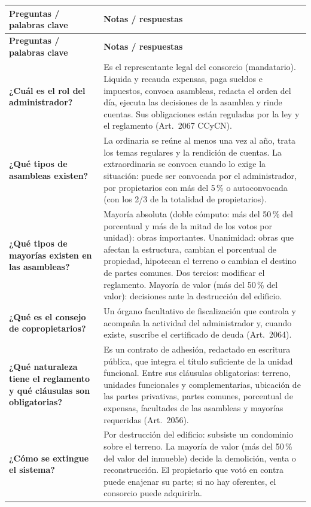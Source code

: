 \documentclass[12pt,oneside]{book}
\newcommand{\cornellheader}{%
    \toprule
    \textbf{Preguntas / palabras clave} &
    \textbf{Notas / respuestas} \\
    \midrule
}
\begin{document}
\begin{longtable}{@{}>{\raggedright\arraybackslash}p{}>{\raggedright\arraybackslash}p{}@{}}
\cornellheader
\endfirsthead
\cornellheader
\endhead

\textbf{¿Cuál es el rol del administrador?} &
Es el representante legal del consorcio (mandatario). Liquida y recauda expensas, paga sueldos e impuestos, convoca asambleas, redacta el orden del día, ejecuta las decisiones de la asamblea y rinde cuentas. Sus obligaciones están reguladas por la ley y el reglamento (Art.~2067 CCyCN). \\[0.8em]

\textbf{¿Qué tipos de asambleas existen?} &
La ordinaria se reúne al menos una vez al año, trata los temas regulares y la rendición de cuentas. La extraordinaria se convoca cuando lo exige la situación: puede ser convocada por el administrador, por propietarios con más del 5\,\% o autoconvocada (con los 2/3 de la totalidad de propietarios). \\[0.8em]

\textbf{¿Qué tipos de mayorías existen en las asambleas?} &
Mayoría absoluta (doble cómputo: más del 50\,\% del porcentual y más de la mitad de los votos por unidad): obras importantes. Unanimidad: obras que afectan la estructura, cambian el porcentual de propiedad, hipotecan el terreno o cambian el destino de partes comunes. Dos tercios: modificar el reglamento. Mayoría de valor (más del 50\,\% del valor): decisiones ante la destrucción del edificio. \\[0.8em]

\textbf{¿Qué es el consejo de copropietarios?} &
Un órgano facultativo de fiscalización que controla y acompaña la actividad del administrador y, cuando existe, suscribe el certificado de deuda (Art.~2064). \\[0.8em]

\textbf{¿Qué naturaleza tiene el reglamento y qué cláusulas son obligatorias?} &
Es un contrato de adhesión, redactado en escritura pública, que integra el título suficiente de la unidad funcional. Entre sus cláusulas obligatorias: terreno, unidades funcionales y complementarias, ubicación de las partes privativas, partes comunes, porcentual de expensas, facultades de las asambleas y mayorías requeridas (Art.~2056). \\[0.8em]

\textbf{¿Cómo se extingue el sistema?} &
Por destrucción del edificio: subsiste un condominio sobre el terreno. La mayoría de valor (más del 50\,\% del valor del inmueble) decide la demolición, venta o reconstrucción. El propietario que votó en contra puede enajenar su parte; si no hay oferentes, el consorcio puede adquirirla. \\[0.8em]


\end{longtable}
\end{document}

